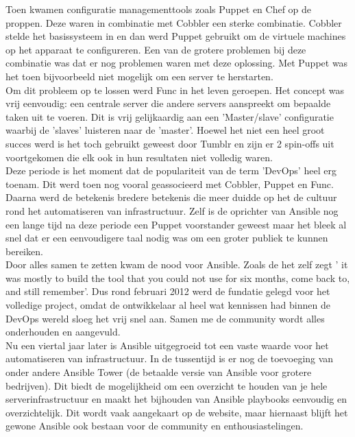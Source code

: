 Toen kwamen configuratie managementtools zoals Puppet en Chef op de proppen. Deze waren in combinatie met Cobbler een sterke combinatie. Cobbler stelde het basissysteem in en dan werd Puppet gebruikt om de virtuele machines op het apparaat te configureren. Een van de grotere problemen bij deze combinatie was dat er nog problemen waren met deze oplossing. Met Puppet was het toen bijvoorbeeld niet mogelijk om een server te herstarten.
\\

Om dit probleem op te lossen werd Func in het leven geroepen. Het concept was vrij eenvoudig: een centrale server die andere servers aanspreekt om bepaalde taken uit te voeren. Dit is vrij gelijkaardig aan een 'Master/slave' configuratie waarbij de 'slaves' luisteren naar de 'master'. Hoewel het niet een heel groot succes werd is het toch gebruikt geweest door Tumblr en zijn er 2 spin-offs uit voortgekomen die elk ook in hun resultaten niet volledig waren.
\\

Deze periode is het moment dat de populariteit van de term 'DevOps' heel erg toenam. Dit werd toen nog vooral geassocieerd met Cobbler, Puppet en Func. Daarna werd de betekenis bredere betekenis die meer duidde op het de cultuur rond het automatiseren van infrastructuur. 
Zelf is de oprichter van Ansible nog een lange tijd na deze periode een Puppet voorstander geweest maar het bleek al snel dat er een eenvoudigere taal nodig was om een groter publiek te kunnen bereiken. 
\\

Door alles samen te zetten kwam de nood voor Ansible. Zoals de \textcite{historyAnsible}  het zelf zegt ' it was mostly to build the tool that you could not use for six months, come back to, and still remember'. Dus rond februari 2012 werd de fundatie gelegd voor het volledige project, omdat de ontwikkelaar al heel wat kennissen had binnen de DevOps wereld sloeg het vrij snel aan. Samen me de community wordt alles onderhouden en aangevuld. \autocite{historyAnsible}
\\

Nu een viertal jaar later is Ansible uitgegroeid tot een vaste waarde voor het automatiseren van infrastructuur. In de tussentijd is er nog de toevoeging van onder andere Ansible Tower (de betaalde versie van Ansible voor grotere bedrijven). Dit biedt de mogelijkheid om een overzicht te houden van je hele serverinfrastructuur en maakt het bijhouden van Ansible playbooks eenvoudig en overzichtelijk. Dit wordt vaak aangekaart op de website, maar hiernaast blijft het gewone Ansible ook bestaan voor de community en enthousiastelingen. 
\\

